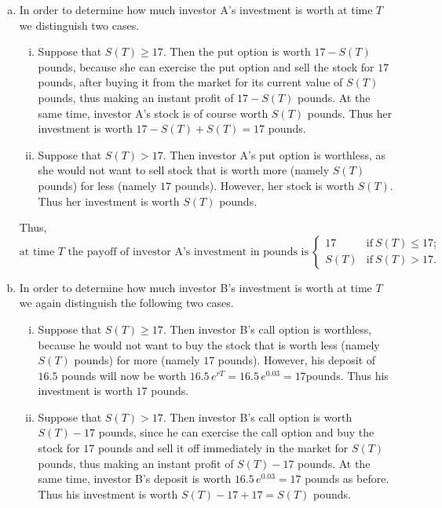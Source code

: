 \documentclass[11pt,a4paper]{article}
\begin{document}
    \begin{enumerate}[(a)]
        \item In order to determine how much investor A’s investment is worth at time $T$ we distinguish two cases.
        \begin{enumerate}[(i)]
            \item Suppose that $S(T) \geq 17$. Then the put option is worth $17 − S(T)$ pounds, because she can exercise the put option and sell the stock for $17$ pounds, after buying it from the market for its current value of $S(T)$ pounds, thus making an instant profit of $17 − S(T)$ pounds. At the same time, investor A’s stock is of course worth $S(T)$ pounds. Thus her investment is worth $17 − S(T) + S(T) = 17$ pounds.
            \item Suppose that $S(T) > 17$. Then investor A’s put option is worthless, as she would not want to sell stock that is worth more (namely $S(T)$ pounds) for less (namely $17$ pounds). However, her stock is worth $S(T)$. Thus her investment is worth $S(T)$ pounds.
        \end{enumerate}
        Thus,
        $$
        \text{at time $T$ the payoff of investor A’s investment in pounds is}\ 
        \begin{cases}
            17 & \text{if}\ S(T) \leq 17;\\
            S(T) & \text{if}\ S(T)>17.
        \end{cases}
        $$
        \item In order to determine how much investor B’s investment is worth at time $T$ we again distinguish the following two cases.
        \begin{enumerate}[(i)]
            \item Suppose that $S(T) \geq 17$. Then investor B’s call option is worthless, because he would not want to buy the stock that is worth less (namely $S(T)$ pounds) for more (namely $17$ pounds). However, his deposit of $16.5$ pounds will now be worth $16.5\, e^{rT}=16.5\,e^{0.03}=17$pounds. Thus his investment is worth $17$ pounds.
            \item Suppose that $S(T) > 17$. Then investor B’s call option is worth $S(T)−17$ pounds, since he can exercise the call option and buy the stock for $17$ pounds and sell it off immediately in the market for $S(T)$ pounds, thus making an instant profit of $S(T) − 17$ pounds. At the same time, investor B’s deposit is worth $16.5\, e^{0.03}=17$ pounds as before. Thus his investment is worth $S(T) − 17 + 17 = S(T)$ pounds.

\end{enumerate}
\end{enumerate}
\end{document}

